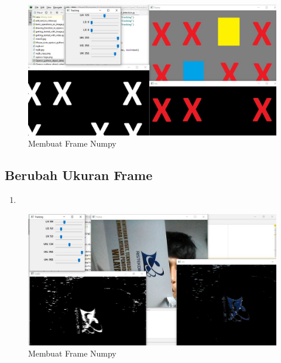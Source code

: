 \begin{figure}[ht]
\centering
\includegraphics[scale=0.5]{figures/2,36,3.jpg}
\caption{Membuat Frame Numpy}
\label{contoh}
\end{figure}



\newpage
\subsection{Berubah Ukuran Frame}

\begin{enumerate}
	\item
\end{enumerate}

\begin{figure}[ht]
\centering
\includegraphics[scale=0.5]{figures/2,37.jpg}
\caption{Membuat Frame Numpy}
\label{contoh}
\end{figure}